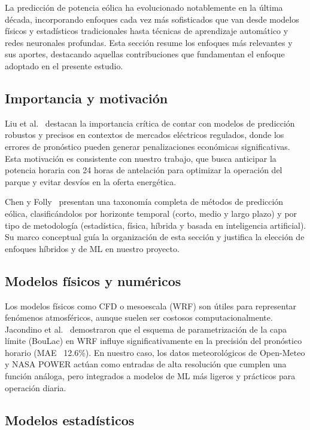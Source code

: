 \documentclass[conference]{IEEEtran}
\begin{document}
	La predicción de potencia eólica ha evolucionado notablemente en la última década, incorporando enfoques cada vez más sofisticados que van desde modelos físicos y estadísticos tradicionales hasta técnicas de aprendizaje automático y redes neuronales profundas. Esta sección resume los enfoques más relevantes y sus aportes, destacando aquellas contribuciones que fundamentan el enfoque adoptado en el presente estudio.
	
	\subsection{Importancia y motivación}
	
	Liu et al.~\cite{liu2023day} destacan la importancia crítica de contar con modelos de predicción robustos y precisos en contextos de mercados eléctricos regulados, donde los errores de pronóstico pueden generar penalizaciones económicas significativas. Esta motivación es consistente con nuestro trabajo, que busca anticipar la potencia horaria con 24 horas de antelación para optimizar la operación del parque y evitar desvíos en la oferta energética.
	
	Chen y Folly~\cite{chen2018wind} presentan una taxonomía completa de métodos de predicción eólica, clasificándolos por horizonte temporal (corto, medio y largo plazo) y por tipo de metodología (estadística, física, híbrida y basada en inteligencia artificial). Su marco conceptual guía la organización de esta sección y justifica la elección de enfoques híbridos y de ML en nuestro proyecto.
	
	\subsection{Modelos físicos y numéricos}
	
	Los modelos físicos como CFD o mesoescala (WRF) son útiles para representar fenómenos atmosféricos, aunque suelen ser costosos computacionalmente. Jacondino et al.~\cite{jacondino2021hourly} demostraron que el esquema de parametrización de la capa límite (BouLac) en WRF influye significativamente en la precisión del pronóstico horario (MAE ~12.6\%). En nuestro caso, los datos meteorológicos de Open-Meteo y NASA POWER actúan como entradas de alta resolución que cumplen una función análoga, pero integrados a modelos de ML más ligeros y prácticos para operación diaria.
	
	\subsection{Modelos estadísticos}
	
\end{document}

